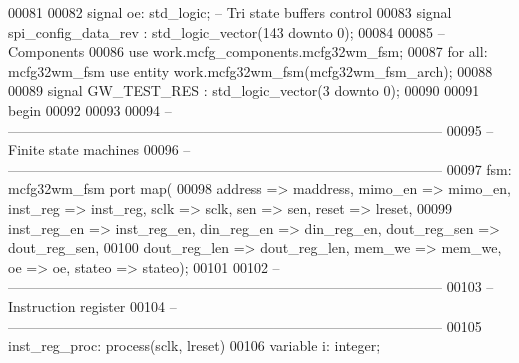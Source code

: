 \begin{DoxyCode}
00081     
00082     \textcolor{keywordflow}{signal} \textcolor{vhdlchar}{oe}\textcolor{vhdlchar}{:} \textcolor{comment}{std\_logic};\textcolor{keyword}{                                       -- Tri state buffers control}
00083     \textcolor{keywordflow}{signal} \textcolor{vhdlchar}{spi_config_data_rev}  \textcolor{vhdlchar}{:} \textcolor{comment}{std\_logic\_vector}\textcolor{vhdlchar}{(}\textcolor{vhdllogic}{}\textcolor{vhdllogic}{143} \textcolor{keywordflow}{downto} \textcolor{vhdllogic}{}\textcolor{vhdllogic}{0}\textcolor{vhdlchar}{)};
00084     
00085 \textcolor{keyword}{    -- Components}
00086 \textcolor{vhdlkeyword}{    use }work.mcfg_components.mcfg32wm\_fsm;
00087     \textcolor{keywordflow}{for} \textcolor{keywordflow}{all}\textcolor{vhdlchar}{:} \textcolor{vhdlchar}{mcfg32wm\_fsm} \textcolor{keywordflow}{use} \textcolor{keywordflow}{entity} \textcolor{vhdlchar}{work}\textcolor{vhdlchar}{.}\textcolor{vhdlchar}{mcfg32wm\_fsm}\textcolor{vhdlchar}{(}\textcolor{vhdlchar}{mcfg32wm\_fsm\_arch}\textcolor{vhdlchar}{)};
00088     
00089     \textcolor{keywordflow}{signal} \textcolor{vhdlchar}{GW_TEST_RES} \textcolor{vhdlchar}{:} \textcolor{comment}{std\_logic\_vector}\textcolor{vhdlchar}{(}\textcolor{vhdllogic}{}\textcolor{vhdllogic}{3} \textcolor{keywordflow}{downto} \textcolor{vhdllogic}{}\textcolor{vhdllogic}{0}\textcolor{vhdlchar}{)};
00090 
00091 \textcolor{vhdlkeyword}{begin}
00092 
00093 
00094 \textcolor{keyword}{    -- ---------------------------------------------------------------------------------------------}
00095 \textcolor{keyword}{    -- Finite state machines}
00096 \textcolor{keyword}{    -- ---------------------------------------------------------------------------------------------}
00097     fsm: mcfg32wm_fsm \textcolor{keywordflow}{port} \textcolor{keywordflow}{map}( 
00098         address => maddress, mimo_en => mimo_en, inst_reg => inst_reg, sclk => 
      sclk, sen => sen, reset => lreset,
00099         inst_reg_en => inst_reg_en, din_reg_en => din_reg_en, dout_reg_sen => 
      dout_reg_sen,
00100         dout_reg_len => dout_reg_len, mem_we => mem_we, oe => oe, stateo => 
      stateo\textcolor{vhdlchar}{)};
00101         
00102 \textcolor{keyword}{    -- ---------------------------------------------------------------------------------------------}
00103 \textcolor{keyword}{    -- Instruction register}
00104 \textcolor{keyword}{    -- ---------------------------------------------------------------------------------------------}
00105     inst\_reg\_proc: \textcolor{keywordflow}{process}(sclk, lreset)
00106         \textcolor{keywordflow}{variable} \textcolor{vhdlchar}{i}\textcolor{vhdlchar}{:} \textcolor{comment}{integer};

\end{DoxyCode}

